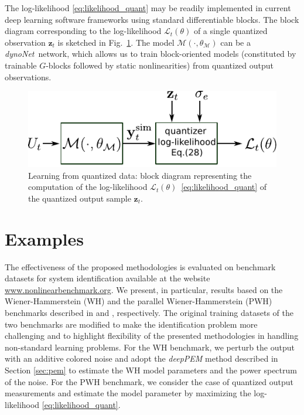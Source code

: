\documentclass{article}
\newcommand{\tvec}[1]{\mathbf{#1}}
\newcommand{\Name}{\emph{dynoNet}}
\newcommand{\vv}{z}
\begin{document}
The log-likelihood \eqref{eq:likelihood_quant} may be readily implemented in 
current deep learning software frameworks using standard differentiable blocks. The block diagram corresponding to the log-likelihood $\mathcal{L}_t(\theta)$ of a single quantized observation $\tvec{\vv}_t$ is sketched in  Fig.~\ref{fig:quantized}. The model   $\mathcal{M}(\cdot, \theta_{\mathcal{M}})$ can be a \Name\ network, which allows us to train   block-oriented models  (constituted by trainable $G$-blocks followed by static nonlinearities)
from quantized output  observations. 

%

 \begin{figure}
 \centering
 \includegraphics[width=.4\textwidth]{fig/dynonet_quant.pdf}\vspace{-0.0cm}
 \caption{Learning from quantized data: block diagram representing the computation of the log-likelihood $\mathcal{L}_t(\theta)$~\eqref{eq:likelihood_quant}  of the quantized output sample $\tvec{\vv}_t$.}
 \label{fig:quantized}
\end{figure}

 


\section{Examples}
\label{sec:examples}
The effectiveness of the proposed methodologies is evaluated on benchmark datasets for system identification  available at the website \url{www.nonlinearbenchmark.org}. We present, in particular, results based on the Wiener-Hammerstein (WH) and the parallel Wiener-Hammerstein (PWH)   benchmarks described in  \cite{ljung2009wiener} and \cite{schoukens2015parametric}, respectively. 
The original training datasets of the two benchmarks are modified to make the identification problem  more challenging and to highlight flexibility of the presented methodologies   in handling non-standard learning problems. For the WH benchmark, we perturb the output with an additive colored noise and adopt the \emph{deepPEM} method described in Section \ref{sec:pem} to   estimate the WH model parameters and the power spectrum of the noise.  For the PWH benchmark,  we consider the case of quantized output measurements and estimate the model parameter by maximizing the log-likelihood \eqref{eq:likelihood_quant}. %
\end{document}
